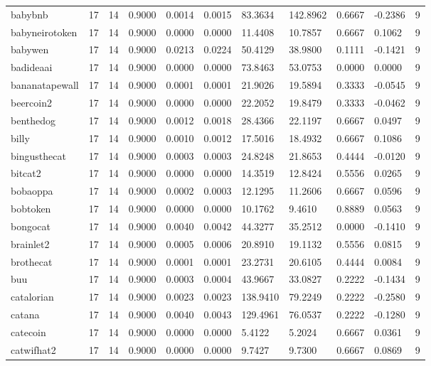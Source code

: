\begin{table}[htbp]
\begin{tabular}{lllllllllll}
babybnb & 17 & 14 & 0.9000 & 0.0014 & 0.0015 & 83.3634 & 142.8962 & 0.6667 & -0.2386 & 9 \\
babyneirotoken & 17 & 14 & 0.9000 & 0.0000 & 0.0000 & 11.4408 & 10.7857 & 0.6667 & 0.1062 & 9 \\
babywen & 17 & 14 & 0.9000 & 0.0213 & 0.0224 & 50.4129 & 38.9800 & 0.1111 & -0.1421 & 9 \\
badideaai & 17 & 14 & 0.9000 & 0.0000 & 0.0000 & 73.8463 & 53.0753 & 0.0000 & 0.0000 & 9 \\
bananatapewall & 17 & 14 & 0.9000 & 0.0001 & 0.0001 & 21.9026 & 19.5894 & 0.3333 & -0.0545 & 9 \\
beercoin2 & 17 & 14 & 0.9000 & 0.0000 & 0.0000 & 22.2052 & 19.8479 & 0.3333 & -0.0462 & 9 \\
benthedog & 17 & 14 & 0.9000 & 0.0012 & 0.0018 & 28.4366 & 22.1197 & 0.6667 & 0.0497 & 9 \\
billy & 17 & 14 & 0.9000 & 0.0010 & 0.0012 & 17.5016 & 18.4932 & 0.6667 & 0.1086 & 9 \\
bingusthecat & 17 & 14 & 0.9000 & 0.0003 & 0.0003 & 24.8248 & 21.8653 & 0.4444 & -0.0120 & 9 \\
bitcat2 & 17 & 14 & 0.9000 & 0.0000 & 0.0000 & 14.3519 & 12.8424 & 0.5556 & 0.0265 & 9 \\
bobaoppa & 17 & 14 & 0.9000 & 0.0002 & 0.0003 & 12.1295 & 11.2606 & 0.6667 & 0.0596 & 9 \\
bobtoken & 17 & 14 & 0.9000 & 0.0000 & 0.0000 & 10.1762 & 9.4610 & 0.8889 & 0.0563 & 9 \\
bongocat & 17 & 14 & 0.9000 & 0.0040 & 0.0042 & 44.3277 & 35.2512 & 0.0000 & -0.1410 & 9 \\
brainlet2 & 17 & 14 & 0.9000 & 0.0005 & 0.0006 & 20.8910 & 19.1132 & 0.5556 & 0.0815 & 9 \\
brothecat & 17 & 14 & 0.9000 & 0.0001 & 0.0001 & 23.2731 & 20.6105 & 0.4444 & 0.0084 & 9 \\
buu & 17 & 14 & 0.9000 & 0.0003 & 0.0004 & 43.9667 & 33.0827 & 0.2222 & -0.1434 & 9 \\
catalorian & 17 & 14 & 0.9000 & 0.0023 & 0.0023 & 138.9410 & 79.2249 & 0.2222 & -0.2580 & 9 \\
catana & 17 & 14 & 0.9000 & 0.0040 & 0.0043 & 129.4961 & 76.0537 & 0.2222 & -0.1280 & 9 \\
catecoin & 17 & 14 & 0.9000 & 0.0000 & 0.0000 & 5.4122 & 5.2024 & 0.6667 & 0.0361 & 9 \\
catwifhat2 & 17 & 14 & 0.9000 & 0.0000 & 0.0000 & 9.7427 & 9.7300 & 0.6667 & 0.0869 & 9 \\

\end{tabular}
\end{table}
